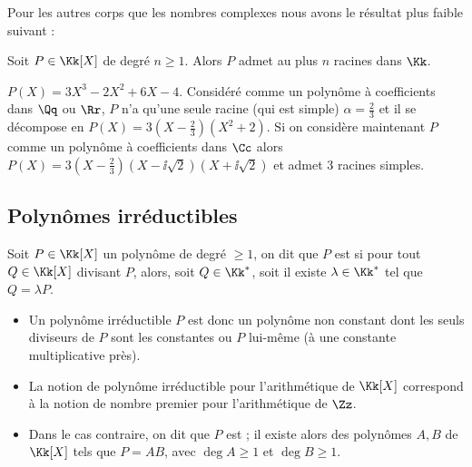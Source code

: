 \documentclass[class=report,crop=false]{standalone}
\begin{document}
Pour les autres corps que les nombres complexes nous avons le résultat
plus faible suivant :
\begin{theoreme}
Soit $P\in\Kk[X]$ de degré $n\ge 1$. Alors
$P$ admet au plus $n$ racines dans $\Kk$.
\end{theoreme}

\begin{exemple}
$P(X)=3X^3-2X^2+6X-4$.
Considéré comme un polynôme à coefficients dans $\Qq$ ou $\Rr$,
$P$ n'a qu'une seule racine (qui est simple) $\alpha = \frac23$ et il se décompose en
$P(X)=3(X-\frac23)(X^2+2)$.
Si on considère maintenant $P$ comme un polynôme à coefficients dans $\Cc$ alors
$P(X)=3(X-\frac23)(X-\ii\sqrt2)(X+\ii\sqrt2)$ et admet $3$ racines simples.
\end{exemple}


\subsection{Polynômes irréductibles}



\begin{definition}
Soit  $P \in\Kk[X]$ un polynôme de degré $\ge 1$, on dit que $P$ est 
 si
pour tout $Q \in\Kk[X]$ divisant $P$, alors, soit $Q \in\Kk^*$, soit il existe $\lambda \in\Kk^*$ tel
que $Q=\lambda P$.
\end{definition}


\begin{remarque*}
\sauteligne
\begin{itemize}
  \item Un polynôme irréductible  $P$ est donc un polynôme non constant
dont les seuls diviseurs de $P$ sont les constantes ou $P$ lui-même
(à une constante multiplicative près).

  \item La notion de polynôme irréductible pour l'arithmétique de $\Kk[X]$
correspond à la notion de nombre premier pour l'arithmétique de $\Zz$.

  \item Dans le cas contraire, on dit que $P$ est  ;
il existe alors des polynômes $A, B$ de $\Kk[X]$ tels que $P=AB$, avec
 $\deg A \ge 1$ et  $\deg B \ge 1$.
\end{itemize}
\end{remarque*}
\end{document}
